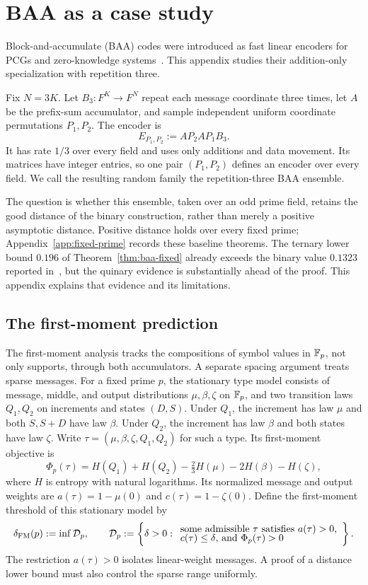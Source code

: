 \section{BAA as a case study}\label{sec:baa}

Block-and-accumulate (BAA) codes were introduced as fast linear encoders for
PCGs and zero-knowledge systems~\cite{baa26}.  This appendix studies their
addition-only specialization with repetition three.

Fix $N=3K$.  Let $B_3:F^K\to F^N$ repeat each message coordinate three
times, let $A$ be the prefix-sum accumulator, and sample independent uniform
coordinate permutations $P_1,P_2$.  The encoder is
\[
  E_{P_1,P_2}:=A P_2 A P_1 B_3.
\]
It has rate $1/3$ over every field and uses only additions and data movement.
Its matrices have integer entries, so one pair $(P_1,P_2)$ defines an encoder
over every field.  We call the resulting random family the repetition-three
BAA ensemble.

The question is whether this ensemble, taken over an odd prime field, retains
the good distance of the binary construction, rather than merely a positive
asymptotic distance.  Positive distance holds over every fixed prime;
Appendix~\ref{app:fixed-prime} records these baseline theorems.  The ternary
lower bound $0.196$ of Theorem~\ref{thm:baa-fixed} already exceeds the binary
value $0.1323$ reported in~\cite{kliewer08}, but the quinary evidence is
substantially ahead of the proof.  This appendix explains that evidence and
its limitations.

\subsection{The first-moment prediction}

The first-moment analysis tracks the compositions of symbol values in $\mathbb F_p$,
not only supports, through both accumulators.  A separate spacing argument
treats sparse messages.  For a
fixed prime $p$, the stationary type model consists of message, middle, and
output distributions $\mu,\beta,\zeta$ on $\mathbb F_p$, and two transition laws
$Q_1,Q_2$ on increments and states $(D,S)$.  Under $Q_1$, the increment has
law $\mu$ and both $S,S+D$ have law $\beta$.  Under $Q_2$, the increment
has law $\beta$ and both states have law $\zeta$.  Write
$\tau=(\mu,\beta,\zeta,Q_1,Q_2)$ for such a type.  Its first-moment objective is
\[
  \Phi_p(\tau)=H(Q_1)+H(Q_2)-\tfrac23H(\mu)-2H(\beta)-H(\zeta),
\]
where $H$ is entropy with natural logarithms.  Its normalized message and
output weights are $a(\tau)=1-\mu(0)$ and $c(\tau)=1-\zeta(0)$.  Define the
first-moment threshold of this stationary model by
\[
  \delta_{\rm FM}(p):=\inf \mathcal D_p,
  \qquad
  \mathcal D_p:=\left\{\delta>0:
  \begin{array}{l}
  \text{some admissible $\tau$ satisfies $a(\tau)>0$,}\\[-1mm]
  \text{$c(\tau)\le\delta$, and $\Phi_p(\tau)>0$}
  \end{array}\right\}.
\]
The restriction $a(\tau)>0$ isolates linear-weight messages.  A proof of a
distance lower bound must also control the sparse range uniformly.

